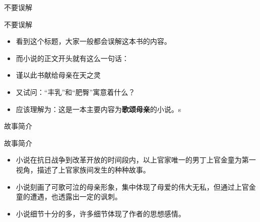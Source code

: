 \documentclass[utf-8]{beamer}
\begin{document}
    \begin{section}{不要误解}
        \begin{frame}{不要误解}
            \begin{itemize}
            \item 看到这个标题，大家一般都会误解这本书的内容。
            \pause
            \item 而小说的正文开头就有这么一句话：
            \pause
            \item \textcolor[rgb]{1.00,0.00,0.00}{谨以此书献给母亲在天之灵}
            \pause
            \item 又试问：“丰乳”和“肥臀”寓意着什么？%
            \pause
            \item 应该理解为：这是一本主要内容为\textbf{歌颂母亲}的小说。s
            \end{itemize}
        \end{frame}
    \end{section}
    \begin{section}{故事简介}
        \begin{frame}{故事简介}
            \pause
            \begin{itemize}
              \item 小说在抗日战争到改革开放的时间段内，以上官家唯一的男丁上官金童为第一视角，描述了上官家族间发生的种种故事。
              \pause
              \item 小说刻画了可歌可泣的母亲形象，集中体现了母爱的伟大无私，但通过上官金童的遭遇，也透露出一定的讽刺。
              \pause
              \item 小说细节十分的多，许多细节体现了作者的思想感情。
            \end{itemize}
        \end{frame}
    \end{section}
\end{document}

